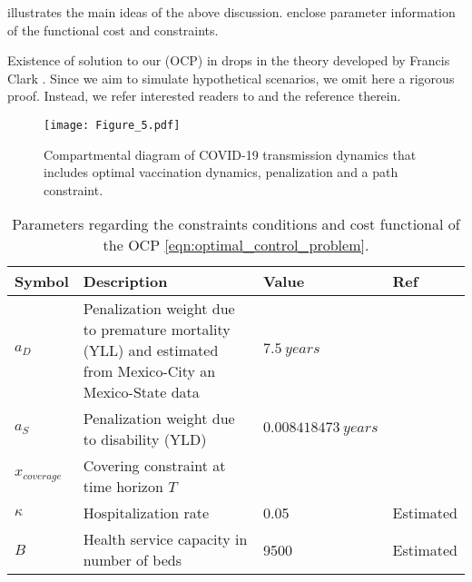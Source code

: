 %
illustrates the main ideas of the above discussion.
enclose parameter information of the functional cost and constraints. 

Existence of solution to our (OCP) in  drops
in the theory developed by Francis Clark
\cite[see e.g.][Thm. 23.11]{Clarke2013}. Since we aim to simulate
hypothetical scenarios, we omit here a rigorous proof. Instead, we refer
interested readers to \cite{Sethi1995,Lenhart2007} and the reference therein.
%
\begin{figure*}[tbh]
    \centering
    \texttt{[image: Figure\_5.pdf]}
    \caption{Compartmental diagram of COVID-19 transmission dynamics
        that
        includes optimal vaccination dynamics, penalization and a path
        constraint.}
    \label{Fig:SchemeModel_opt}
\end{figure*}
%
\begin{table*}[htb]
    \centering
    \begin{tabular}{%
            >{\centering}
            p{}
            p{}
            p{}
            p{}
        }
        \toprule
        \textbf{Symbol}
        & \textbf{Description}
        & \textbf{Value}
        & \textbf{Ref}
        \\
        \midrule
        $a_D$
        &
        Penalization weight due to  premature mortality (YLL)
        and estimated from Mexico-City an Mexico-State data
        & $\SI{7.5}{years}$ & \cite{WhoDALY,DataMX}
        \\
        $a_S$
        &
        Penalization weight due to disability (YLD)
        & $\SI{0.008418473}{years}$ & \cite{Jo2020}
        \\
        $x_{coverage}$
        &
        Covering constraint at time horizon $T$
        & & \cite{sage2020}
        \\
        $\kappa$
        &
        Hospitalization rate
        &
        \num{0.05}
        &
        Estimated
        \\
        $B$
        &
        Health service capacity in number of beds
        &
        \num{9500}
        &
        Estimated
        \\
        \bottomrule
    \end{tabular}
    \caption{
        Parameters regarding the
constraints conditions and cost functional of the OCP
\eqref{eqn:optimal_control_problem}.}
    \label{tbl:ocp_parameters_description}
\end{table*}